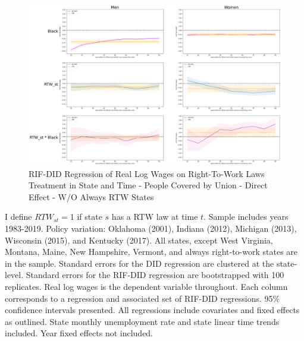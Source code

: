 \documentclass[11pt]{article}
\begin{document}
{\pagebreak
\begin{landscape}
\begin{figure}[ht!]
\centering
    \caption{RIF-DID Regression of Real Log Wages on Right-To-Work Laws Treatment in State and Time - People Covered by Union - Direct Effect - W/O Always RTW States}\label{fig:rifdid-sltt-wo-ar2w-C}
    \includegraphics[width=1.25\textwidth, height = \textheight, keepaspectratio]{figures/fin_rifdid-sltt-wo-ar2w-C.png}
\end{figure}
\footnotesize{I define $RTW_{st} = 1$ if state $s$ has a RTW law at time $t$. Sample includes years 1983-2019. Policy variation: Oklahoma (2001), Indiana (2012), Michigan (2013), Wisconsin (2015), and Kentucky (2017). All states, except West Virginia, Montana, Maine, New Hampshire, Vermont, and always right-to-work states are in the sample. Standard errors for the DID regression are clustered at the state-level. Standard errors for the RIF-DID regression are bootstrapped with 100 replicates. Real log wages is the dependent variable throughout. Each column corresponds to a regression and associated set of RIF-DID regressions. 95\% confidence intervals presented. All regressions include covariates and fixed effects as outlined. State monthly unemployment rate and state linear time trends included. Year fixed effects not included.}
\end{landscape}

}
\end{document}
